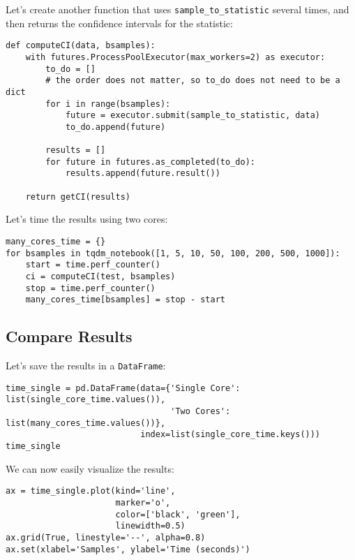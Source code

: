 \documentclass[12pt, a4paper]{article}
\begin{document}
Let's create another function that uses \texttt{sample\_to\_statistic} several times, and then returns the confidence intervals for the statistic:
\lstset{language=jupyter-python,label= ,caption= ,captionpos=b,numbers=none}
\begin{lstlisting}
def computeCI(data, bsamples):
    with futures.ProcessPoolExecutor(max_workers=2) as executor:
        to_do = []
        # the order does not matter, so to_do does not need to be a dict
        for i in range(bsamples):
            future = executor.submit(sample_to_statistic, data)
            to_do.append(future)

        results = []
        for future in futures.as_completed(to_do):
            results.append(future.result())

    return getCI(results)
\end{lstlisting}

Let's time the results using two cores:
\lstset{language=jupyter-python,label= ,caption= ,captionpos=b,numbers=none}
\begin{lstlisting}
many_cores_time = {}
for bsamples in tqdm_notebook([1, 5, 10, 50, 100, 200, 500, 1000]):
    start = time.perf_counter()
    ci = computeCI(test, bsamples)
    stop = time.perf_counter()
    many_cores_time[bsamples] = stop - start
\end{lstlisting}

\subsection{Compare Results}
\label{sec:org3b49e21}
Let's save the results in a \texttt{DataFrame}:
\lstset{language=jupyter-python,label= ,caption= ,captionpos=b,numbers=none}
\begin{lstlisting}
time_single = pd.DataFrame(data={'Single Core': list(single_core_time.values()),
                                 'Two Cores': list(many_cores_time.values())},
                           index=list(single_core_time.keys()))
time_single
\end{lstlisting}

We can now easily visualize the results:
\lstset{language=jupyter-python,label= ,caption= ,captionpos=b,numbers=none}
\begin{lstlisting}
ax = time_single.plot(kind='line',
                      marker='o',
                      color=['black', 'green'],
                      linewidth=0.5)
ax.grid(True, linestyle='--', alpha=0.8)
ax.set(xlabel='Samples', ylabel='Time (seconds)')
\end{lstlisting}
\end{document}
